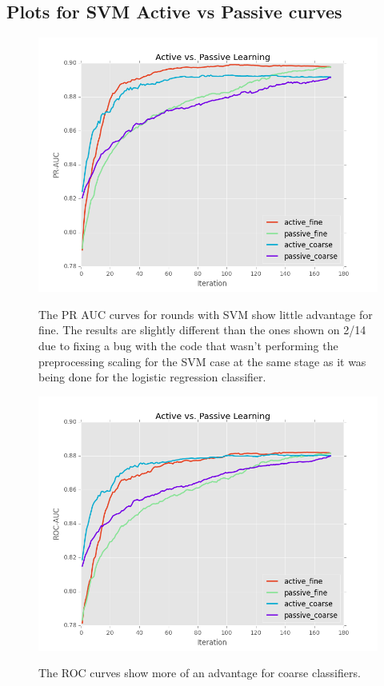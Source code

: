 \documentclass[ms]{nuthesis}
\begin{document}
\FloatBarrier
\subsection{Plots for SVM Active vs Passive curves}
\begin{figure}[!htb]
	\centering
    \includegraphics[width=1.0\columnwidth]{fig/runActPassSVM_pr}
    \label{fig:ActiveVsPassivePRSVM}
    \caption{The PR AUC curves for rounds with SVM show little
advantage for fine. The results are slightly different than the ones shown
on 2/14 due to fixing a bug with the code that wasn't performing the
preprocessing scaling for the SVM case at the same stage as it was being
done for the logistic regression classifier.}
\end{figure}
\FloatBarrier

\FloatBarrier
\begin{figure}[!htb]
	\centering
    \includegraphics[width=1.0\columnwidth]{fig/runActPassSVM_roc}
    \label{fig:ActiveVsPassiveROCSVM}
    \caption{The ROC curves show more of an advantage for coarse classifiers.}
\end{figure}
\FloatBarrier
\end{document}
